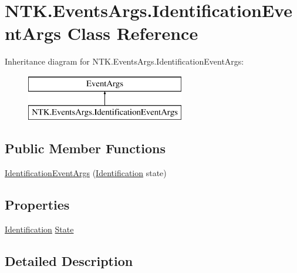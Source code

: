 \hypertarget{class_n_t_k_1_1_events_args_1_1_identification_event_args}{}\section{N\+T\+K.\+Events\+Args.\+Identification\+Event\+Args Class Reference}
\label{class_n_t_k_1_1_events_args_1_1_identification_event_args}
Inheritance diagram for N\+T\+K.\+Events\+Args.\+Identification\+Event\+Args\+:\begin{figure}[H]
\begin{center}
\leavevmode
\includegraphics[height=2.000000cm]{d3/d53/class_n_t_k_1_1_events_args_1_1_identification_event_args}
\end{center}
\end{figure}
\subsection*{Public Member Functions}
\begin{DoxyCompactItemize}
\item 
\mbox{\hyperlink{class_n_t_k_1_1_events_args_1_1_identification_event_args_a3eca5646646247b150d3776acea6b8d1}{Identification\+Event\+Args}} (\mbox{\hyperlink{namespace_n_t_k_aa439a107aef6a5399750b755a88ccf07}{Identification}} state)
\end{DoxyCompactItemize}
\subsection*{Properties}
\begin{DoxyCompactItemize}
\item 
\mbox{\hyperlink{namespace_n_t_k_aa439a107aef6a5399750b755a88ccf07}{Identification}} \mbox{\hyperlink{class_n_t_k_1_1_events_args_1_1_identification_event_args_a8f27e067071f88a0610606fc3428014e}{State}}
\end{DoxyCompactItemize}


\subsection{Detailed Description}


